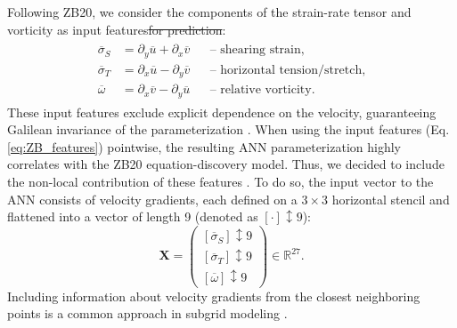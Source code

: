 \documentclass[draft]{agujournal2019}
\providecommand{\DIFdel}[1]{{\protect\color{red}\sout{#1}}}                      %
\providecommand{\DIFdelbegin}{} %
\providecommand{\DIFdelend}{} %
\begin{document}
Following ZB20, we consider the components of the strain-rate tensor and vorticity as input features\DIFdelbegin \DIFdel{for prediction}\DIFdelend :
\begin{gather}
    \begin{aligned}
        \overline{\sigma}_S & = \partial_y \overline{u} + \partial_x \overline{v} && \text{-- shearing strain,} \\
        \overline{\sigma}_T & = \partial_x \overline{u} - \partial_y \overline{v} && \text{-- horizontal tension/stretch,} \\
        \overline{\omega} & = \partial_x \overline{v} - \partial_y \overline{u} && \text{-- relative vorticity.}
    \end{aligned} \label{eq:ZB_features}
\end{gather}
These input features exclude explicit dependence on the velocity, guaranteeing Galilean invariance of the parameterization \cite{srinivasan2024turbulence,pope1975more, lund1993parameterization, ling2016reynolds}. When using the input features (Eq. \eqref{eq:ZB_features}) pointwise, the resulting ANN parameterization highly correlates with the ZB20 equation-discovery model. Thus, we decided to include the non-local contribution of these features \cite{srinivasan2024turbulence}. To do so, the input vector to the ANN consists of velocity gradients, each defined on a $3 \times 3$ horizontal stencil and flattened into a vector of length 9 (denoted as $\left[ \cdot \right]{\updownarrow \scriptstyle 9}$):
\begin{equation}
    \mathbf{X} =
    \begin{pmatrix}
        \left[ \overline{\sigma}_S \right]{\updownarrow \scriptstyle 9}  \\
        \left[ \overline{\sigma}_T \right]{\updownarrow \scriptstyle 9} \\
        \left[ \overline{\omega} \right]{\updownarrow \scriptstyle 9}
    \end{pmatrix} \in \mathbb{R}^{27}. \label{eq:stack_features}
\end{equation}
Including information about velocity gradients from the closest neighboring points is a common approach in subgrid modeling \cite{maulik2017neural, maulik2019subgrid, pawar2020priori, wang2021artificial, wang2022constant, gultekin2024analysis}.
\end{document}
